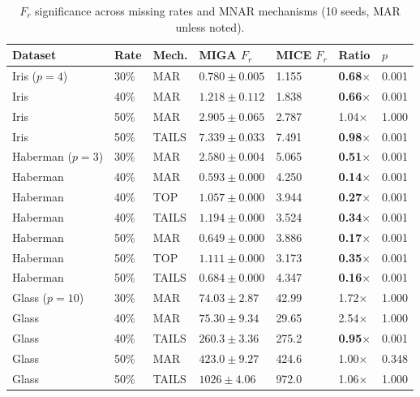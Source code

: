 \begin{table}[h]
\caption{$F_r$ significance across missing rates and MNAR mechanisms (10 seeds, MAR unless noted).}
\label{tab:fr_rates}
\centering
\begin{tabular}{lllllll}
\toprule
\textbf{Dataset} & \textbf{Rate} & \textbf{Mech.} & \textbf{MIGA $F_r$} & \textbf{MICE $F_r$} & \textbf{Ratio} & $p$ \\
\midrule
Iris ($p=4$)  & 30\% & MAR   & $0.780 \pm 0.005$ & 1.155 & \textbf{0.68$\times$} & 0.001 \\
Iris          & 40\% & MAR   & $1.218 \pm 0.112$ & 1.838 & \textbf{0.66$\times$} & 0.001 \\
Iris          & 50\% & MAR   & $2.905 \pm 0.065$ & 2.787 & 1.04$\times$          & 1.000 \\
Iris          & 50\% & TAILS & $7.339 \pm 0.033$ & 7.491 & \textbf{0.98$\times$} & 0.001 \\
\midrule
Haberman ($p=3$) & 30\% & MAR   & $2.580 \pm 0.004$ & 5.065 & \textbf{0.51$\times$} & 0.001 \\
Haberman      & 40\% & MAR   & $0.593 \pm 0.000$ & 4.250 & \textbf{0.14$\times$} & 0.001 \\
Haberman      & 40\% & TOP   & $1.057 \pm 0.000$ & 3.944 & \textbf{0.27$\times$} & 0.001 \\
Haberman      & 40\% & TAILS & $1.194 \pm 0.000$ & 3.524 & \textbf{0.34$\times$} & 0.001 \\
Haberman      & 50\% & MAR   & $0.649 \pm 0.000$ & 3.886 & \textbf{0.17$\times$} & 0.001 \\
Haberman      & 50\% & TOP   & $1.111 \pm 0.000$ & 3.173 & \textbf{0.35$\times$} & 0.001 \\
Haberman      & 50\% & TAILS & $0.684 \pm 0.000$ & 4.347 & \textbf{0.16$\times$} & 0.001 \\
\midrule
Glass ($p=10$) & 30\% & MAR   & $74.03 \pm 2.87$  & 42.99 & 1.72$\times$          & 1.000 \\
Glass         & 40\% & MAR   & $75.30 \pm 9.34$  & 29.65 & 2.54$\times$          & 1.000 \\
Glass         & 40\% & TAILS & $260.3 \pm 3.36$  & 275.2 & \textbf{0.95$\times$} & 0.001 \\
Glass         & 50\% & MAR   & $423.0 \pm 9.27$  & 424.6 & 1.00$\times$          & 0.348 \\
Glass         & 50\% & TAILS & $1026 \pm 4.06$   & 972.0 & 1.06$\times$          & 1.000 \\
\bottomrule
\end{tabular}
\end{table}

